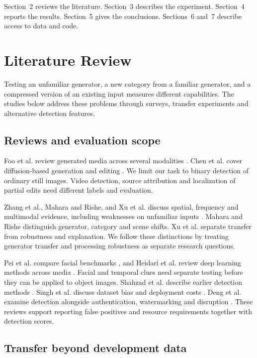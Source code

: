 \documentclass[11pt,a4paper]{article}
\begin{document}
Section~2 reviews the literature. Section~3 describes the experiment. Section~4 reports the results. Section~5 gives the conclusions. Sections~6 and~7 describe access to data and code.

\section{Literature Review}
Testing an unfamiliar generator, a new category from a familiar generator, and a compressed version of an existing input measures different capabilities. The studies below address these problems through surveys, transfer experiments and alternative detection features.


\subsection{Reviews and evaluation scope}


Foo et al. review generated media across several modalities \cite{r13}. Chen et al. cover diffusion-based generation and editing \cite{r14}. We limit our task to binary detection of ordinary still images. Video detection, source attribution and localization of partial edits need different labels and evaluation.

Zhang et al., Mahara and Rishe, and Xu et al. discuss spatial, frequency and multimodal evidence, including weaknesses on unfamiliar inputs \cite{r15,r16,r17}. Mahara and Rishe distinguish generator, category and scene shifts. Xu et al. separate transfer from robustness and explanation. We follow these distinctions by treating generator transfer and processing robustness as separate research questions.

Pei et al. compare facial benchmarks \cite{r18}, and Heidari et al. review deep learning methods across media \cite{r19}. Facial and temporal clues need separate testing before they can be applied to object images. Shahzad et al. describe earlier detection methods \cite{r20}. Singh et al. discuss dataset bias and deployment costs \cite{r21}. Deng et al. examine detection alongside authentication, watermarking and disruption \cite{r22}. These reviews support reporting false positives and resource requirements together with detection scores.


\subsection{Transfer beyond development data}
\end{document}
